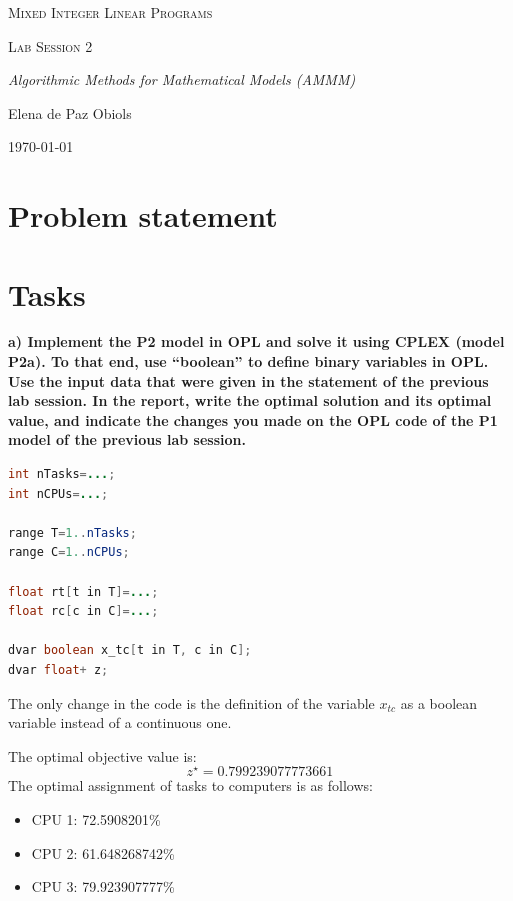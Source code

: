 \documentclass{article}
\begin{document}
\begin{titlepage}
\centering
\vspace*{7cm}
{\scshape\Huge Mixed Integer Linear Programs \par}
\vspace{1cm}
{\scshape\Large Lab Session 2 \par}
\vspace{1cm}
{\itshape\Large Algorithmic Methods for Mathematical Models (AMMM) \par}
\vspace{8cm}
{\Large Elena de Paz Obiols \par}
{\Large \today \par}
\end{titlepage}
\vspace*{0.5cm}

\tableofcontents
\newpage
\section{Problem statement}

\newpage
\section{Tasks}

\textbf{a) Implement the P2 model in OPL and solve it using CPLEX (model P2a). To that end, use “boolean” to define binary variables in OPL. Use the input data that were given in the statement of the previous lab session. In the report, write the optimal solution and its optimal value, and indicate the changes you made on the OPL code of the P1 model of the previous lab session.}

\begin{lstlisting}[language=Java, frame=single, xleftmargin=0pt]
int nTasks=...;
int nCPUs=...;

range T=1..nTasks;
range C=1..nCPUs;

float rt[t in T]=...;
float rc[c in C]=...;

dvar boolean x_tc[t in T, c in C];
dvar float+ z;
\end{lstlisting}

The only change in the code is the definition of the variable \(x_{tc}\)  as a boolean variable instead of a continuous one.


The optimal objective value is:
\[
z^\star = 0.799239077773661
\]
The optimal assignment of tasks to computers is as follows:
\begin{itemize}
    \item CPU 1: 72.5908201\%
    \item CPU 2: 61.648268742\%
    \item CPU 3: 79.923907777\%
\end{itemize}
\end{document}
